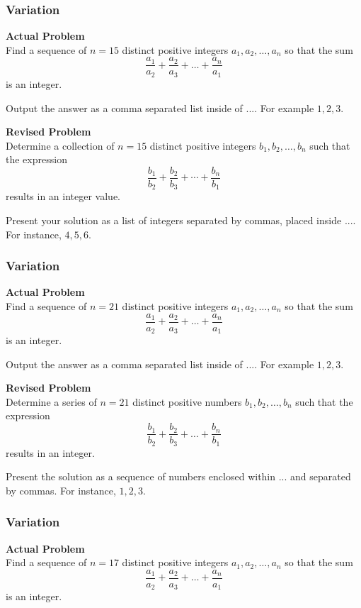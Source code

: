 \subsubsection{Variation}
\textbf{Actual Problem}\\
Find a sequence of $n = 15$ distinct positive integers $a_1, a_2, \ldots, a_n$ so that the sum
$$\frac{a_1}{a_2} + \frac{a_2}{a_3} + \ldots +\frac{a_n}{a_1}$$ is an integer.

Output the answer as a comma separated list inside of $\boxed{...}$. For example $\boxed{1, 2, 3}$.

\textbf{Revised Problem}\\
Determine a collection of $n = 15$ distinct positive integers $b_1, b_2, \ldots, b_n$ such that the expression
$$\frac{b_1}{b_2} + \frac{b_2}{b_3} + \cdots + \frac{b_n}{b_1}$$ results in an integer value.

Present your solution as a list of integers separated by commas, placed inside $\boxed{...}$. For instance, $\boxed{4, 5, 6}$.

\subsubsection{Variation}
\textbf{Actual Problem}\\
Find a sequence of $n = 21$ distinct positive integers $a_1, a_2, \ldots, a_n$ so that the sum
$$\frac{a_1}{a_2} + \frac{a_2}{a_3} + \ldots +\frac{a_n}{a_1}$$ is an integer.

Output the answer as a comma separated list inside of $\boxed{...}$. For example $\boxed{1, 2, 3}$.

\textbf{Revised Problem}\\
Determine a series of $n = 21$ distinct positive numbers $b_1, b_2, \ldots, b_n$ such that the expression
$$\frac{b_1}{b_2} + \frac{b_2}{b_3} + \ldots +\frac{b_n}{b_1}$$ results in an integer.

Present the solution as a sequence of numbers enclosed within $\boxed{...}$ and separated by commas. For instance, $\boxed{1, 2, 3}$.

\subsubsection{Variation}
\textbf{Actual Problem}\\
Find a sequence of $n = 17$ distinct positive integers $a_1, a_2, \ldots, a_n$ so that the sum
$$\frac{a_1}{a_2} + \frac{a_2}{a_3} + \ldots +\frac{a_n}{a_1}$$ is an integer.


